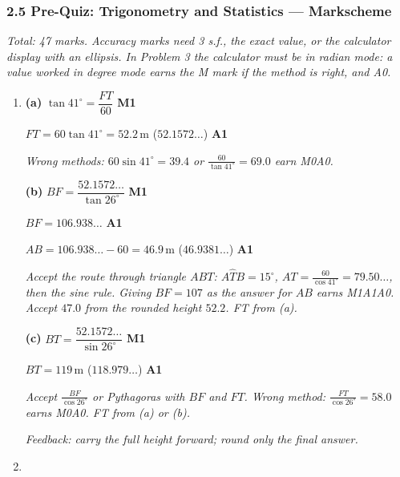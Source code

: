\documentclass[12pt, twoside]{article}
\begin{document}
\subsubsection*{2.5 Pre-Quiz: Trigonometry and Statistics --- Markscheme}

\emph{Total: 47 marks. Accuracy marks need 3 s.f., the exact value, or the
calculator display with an ellipsis. In Problem 3 the calculator must be in
radian mode: a value worked in degree mode earns the M mark if the method is
right, and A0.}

\begin{enumerate}[itemsep=0.3cm]

\item[1.] [Maximum mark: 7]

\textbf{(a)} $\tan 41^\circ = \dfrac{FT}{60}$ \hfill \textbf{M1}

$FT = 60\tan 41^\circ = 52.2\,\text{m}$ \quad ($52.1572\ldots$) \hfill \textbf{A1}

\emph{Wrong methods: $60\sin 41^\circ = 39.4$ or $\frac{60}{\tan 41^\circ} =
69.0$ earn M0A0.}

\textbf{(b)} $BF = \dfrac{52.1572\ldots}{\tan 26^\circ}$ \hfill \textbf{M1}

$BF = 106.938\ldots$ \hfill \textbf{A1}

$AB = 106.938\ldots - 60 = 46.9\,\text{m}$ \quad ($46.9381\ldots$) \hfill \textbf{A1}

\emph{Accept the route through triangle $ABT$: $A\hat{T}B = 15^\circ$,
$AT = \frac{60}{\cos 41^\circ} = 79.50\ldots$, then the sine rule. Giving
$BF = 107$ as the answer for $AB$ earns M1A1A0. Accept $47.0$ from the
rounded height $52.2$. FT from (a).}

\textbf{(c)} $BT = \dfrac{52.1572\ldots}{\sin 26^\circ}$ \hfill \textbf{M1}

$BT = 119\,\text{m}$ \quad ($118.979\ldots$) \hfill \textbf{A1}

\emph{Accept $\frac{BF}{\cos 26^\circ}$ or Pythagoras with $BF$ and $FT$.
Wrong method: $\frac{FT}{\cos 26^\circ} = 58.0$ earns M0A0. FT from (a) or
(b).}

\emph{Feedback: carry the full height forward; round only the final
answer.}

\newpage

\item[2.] [Maximum mark: 7]


\end{enumerate}
\end{document}
